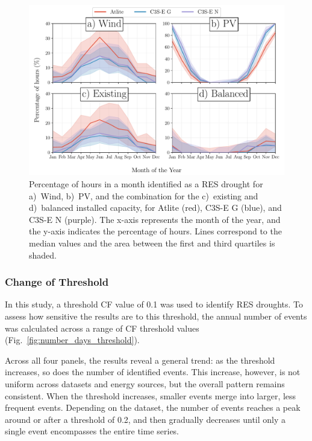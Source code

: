 \documentclass[a4paper, 11pt]{article}
\begin{document}
\begin{figure}[!ht]
	\centering
	\includegraphics[width=\textwidth]{droughts_seasonality}
	\caption{Percentage of hours in a month identified as a RES drought for a)~Wind, b)~PV, and the combination for the c)~existing and d)~balanced installed capacity, for Atlite (red), C3S-E G (blue), and C3S-E N (purple). The x-axis represents the month of the year, and the y-axis indicates the percentage of hours. Lines correspond to the median values and the area between the first and third quartiles is shaded.}
	\label{fig:res_droughts_seasonality}
\end{figure}

\newpage
\subsubsection{Change of Threshold}

In this study, a threshold CF value of 0.1 was used to identify RES droughts. To assess how sensitive the results are to this threshold, the annual number of events was calculated across a range of CF threshold values (Fig.~\ref{fig:number_days_threshold}).

Across all four panels, the results reveal a general trend: as the threshold increases, so does the number of identified events. This increase, however, is not uniform across datasets and energy sources, but the overall pattern remains consistent. When the threshold increases, smaller events merge into larger, less frequent events. Depending on the dataset, the number of events reaches a peak around or after a threshold of 0.2, and then gradually decreases until only a single event encompasses the entire time series.
\end{document}
